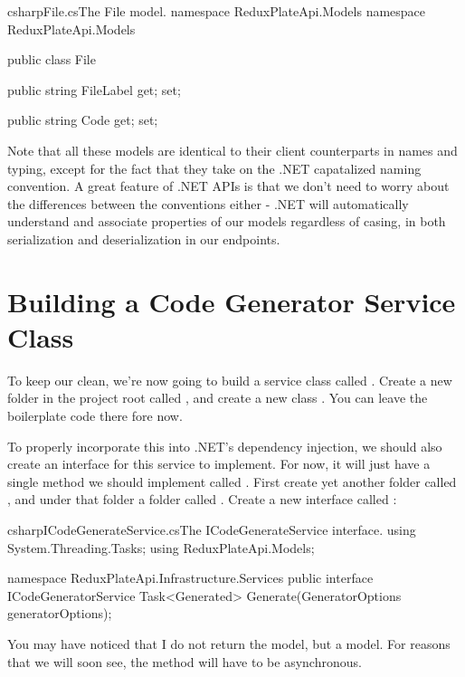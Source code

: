 \documentclass[paper=6in:9in,pagesize=pdftex,headinclude=on,footinclude=on,12pt,twoside]{scrbook}
\begin{document}
\begin{codeInput}{csharp}{File.cs}{The File model.}
namespace ReduxPlateApi.Models
namespace ReduxPlateApi.Models
{
    public class File
    {
        public string FileLabel { get; set; }

        public string Code { get; set; }
    }
}
\end{codeInput}

Note that all these models are identical to their client counterparts in names and typing, except for the fact that they take on the .NET capatalized naming convention. A great feature of .NET APIs is that we don't need to worry about the differences between the conventions either - .NET will automatically understand and associate properties of our models regardless of casing, in both serialization and deserialization in our endpoints.

\section{Building a Code Generator Service Class}

To keep our  clean, we're now going to build a service class called . Create a new folder in the project root called , and create a new class . You can leave the boilerplate code there fore now.

To properly incorporate this into .NET's dependency injection, we should also create an interface for this service to implement. For now, it will just have a single method we should implement called . First create yet another folder called , and under that folder a folder called . Create a new interface called :

\begin{codeInput}{csharp}{ICodeGenerateService.cs}{The ICodeGenerateService interface.}
using System.Threading.Tasks;
using ReduxPlateApi.Models;

namespace ReduxPlateApi.Infrastructure.Services
{
    public interface ICodeGeneratorService
    {
        Task<Generated> Generate(GeneratorOptions generatorOptions);
    }
}
\end{codeInput}

You may have noticed that I do not return the  model, but a  model. For reasons that we will soon see, the  method will have to be asynchronous. 
\end{document}
